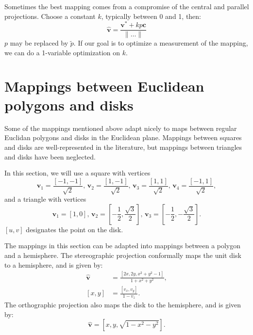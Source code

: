 \documentclass{amsart}[12pt]
\begin{document}
Sometimes the best mapping comes from a compromise of the central and
parallel projections. Choose a constant $k$, typically between 0 and 1, then:
\begin{equation}
  \hat{\mathbf v} = \frac{\mathbf v^* + kp\mathbf c}{\|\dots\|}
\end{equation}
$p$ may be replaced by $\widetilde{p}$. If our goal is to optimize a
measurement of the mapping, we can do a 1-variable optimization on $k$.

\section{Mappings between Euclidean polygons and disks}
Some of the mappings mentioned above adapt nicely to maps between regular
Euclidan polygons and disks in the Euclidean plane. Mappings between squares
and disks are well-represented in the literature, but mappings between
triangles and disks have been neglected.
\cite{fong15}\cite{fong16}\cite{fong18}\cite{lambers}

In this section, we will use a square with vertices
\begin{equation}
  \mathbf{v}_1 = \frac{[-1,-1]}{\sqrt 2}, \,
  \mathbf{v}_2 = \frac{[1,-1]}{\sqrt 2}, \,
  \mathbf{v}_3 = \frac{[1,1]}{\sqrt 2}, \,
  \mathbf{v}_4 = \frac{[-1,1]}{\sqrt 2},
\end{equation}
and a triangle with vertices
\begin{equation}
  \mathbf{v}_1 = \left[1, 0\right], \,
  \mathbf{v}_2 = \left[-\frac{1}{2}, \frac{\sqrt{3}}{2}\right], \,
  \mathbf{v}_3 = \left[-\frac{1}{2}, -\frac{\sqrt{3}}{2}\right].
\end{equation}
$[u, v]$ designates the point on the disk.

The mappings in this section can be adapted into mappings between a polygon and
a hemisphere. The stereographic projection conformally maps
the unit disk to a hemisphere, and is given by:
\begin{equation}\begin{split}
  \hat{\mathbf v} &= \frac{[2x, 2y, x^2+y^2-1]}{1+x^2+y^2}, \\
  [x, y] & = \frac{[v_x, v_y]}{1-v_z}.
\end{split}\end{equation}
The orthographic projection also maps the disk to the hemisphere,
and is given by:
\begin{equation}
  \hat{\mathbf v} = [x, y, \sqrt{1-x^2-y^2}].
\end{equation}
\end{document}
